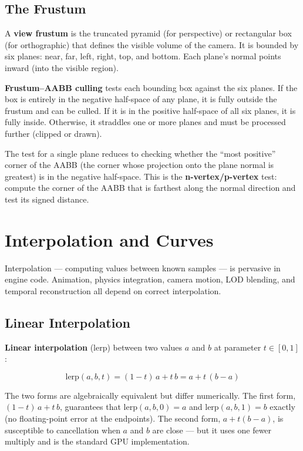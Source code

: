 \documentclass[
  11pt,
  letterpaper,
  DIV=11,
  numbers=noendperiod,
  twoside,
  open=right]{scrreprt}
\begin{document}
\subsection{The Frustum}\label{the-frustum}

A \textbf{view frustum} is the truncated pyramid (for perspective) or
rectangular box (for orthographic) that defines the visible volume of
the camera. It is bounded by six planes: near, far, left, right, top,
and bottom. Each plane's normal points inward (into the visible region).

\textbf{Frustum--AABB culling} tests each bounding box against the six
planes. If the box is entirely in the negative half-space of any plane,
it is fully outside the frustum and can be culled. If it is in the
positive half-space of all six planes, it is fully inside. Otherwise, it
straddles one or more planes and must be processed further (clipped or
drawn).

The test for a single plane reduces to checking whether the ``most
positive'' corner of the AABB (the corner whose projection onto the
plane normal is greatest) is in the negative half-space. This is the
\textbf{n-vertex/p-vertex} test: compute the corner of the AABB that is
farthest along the normal direction and test its signed distance.

\section{Interpolation and Curves}\label{interpolation-and-curves}

Interpolation --- computing values between known samples --- is
pervasive in engine code. Animation, physics integration, camera motion,
LOD blending, and temporal reconstruction all depend on correct
interpolation.

\subsection{Linear Interpolation}\label{linear-interpolation}

\textbf{Linear interpolation} (lerp) between two values \(a\) and \(b\)
at parameter \(t \in [0, 1]\):

\[
\text{lerp}(a, b, t) = (1 - t) \, a + t \, b = a + t \, (b - a)
\]

The two forms are algebraically equivalent but differ numerically. The
first form, \((1 - t) \, a + t \, b\), guarantees that
\(\text{lerp}(a, b, 0) = a\) and \(\text{lerp}(a, b, 1) = b\) exactly
(no floating-point error at the endpoints). The second form,
\(a + t(b - a)\), is susceptible to cancellation when \(a\) and \(b\)
are close --- but it uses one fewer multiply and is the standard GPU
implementation.
\end{document}
